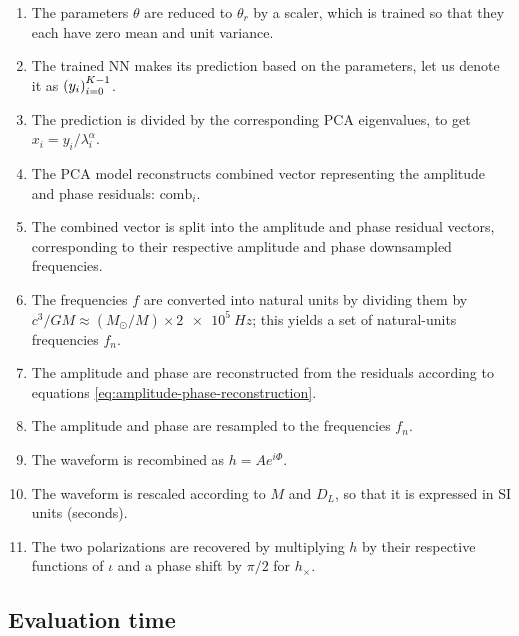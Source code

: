 \documentclass[main.tex]{subfiles}
\begin{document}
\begin{enumerate}
    \item The parameters \(\theta \) are reduced to \(\theta _r\) by a scaler, which is trained so that they each have zero mean and unit variance. \label{item:param-reduction}
    \item The trained \ac{NN} makes its prediction based on the parameters, let us denote it as \(\qty(y_i)_{i=0}^{K-1}\). \label{item:nn-prediction}
    \item The prediction is divided by the corresponding \ac{PCA} eigenvalues, to get \(x_i = y_i / \lambda _i^{\alpha }\).
    \item The \ac{PCA} model reconstructs combined vector representing the amplitude and phase residuals: \(\text{comb}_i\). \label{item:pca-reconstruction}
    \item The combined vector is split into the amplitude and phase residual vectors, corresponding to their respective amplitude and phase downsampled frequencies. \label{item:combined-split}
    \item The frequencies \(f\) are converted into natural units by dividing them by \(c^3 / GM \approx (M_{\odot} / M) \times  \SI{2e5}{Hz}\); this yields a set of natural-units frequencies \(f_n\). \label{item:frequency-conversion}
    \item The amplitude and phase are reconstructed from the residuals according to equations \eqref{eq:amplitude-phase-reconstruction}. \label{item:tf2}
    \item The amplitude and phase are resampled to the frequencies \(f_n\). \label{item:resample}
    \item The waveform is recombined as \(h = A e^{i \Phi }\). \label{item:recombine}
    \item The waveform is rescaled according to \(M\) and \(D_L\), so that it is expressed in SI units (seconds). \label{item:rescale}
    \item The two polarizations are recovered by multiplying \(h\) by their respective functions of \(\iota \) and a phase shift by \(\pi /2\) for \(h_ \times \). \label{item:polarizations}
\end{enumerate}

\subsection{Evaluation time} \label{sec:evaluation-time}
\end{document}
